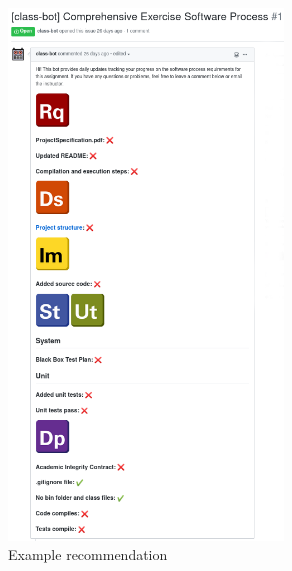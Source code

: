 \begin{figure}[htbp]
\centering
	\includegraphics[width=0.65\textwidth]{Chapter-6/images/class-bot1162.png}
	\caption{Example \tooltwo recommendation}	
	\label{fig:class-bot} 
\end{figure}
